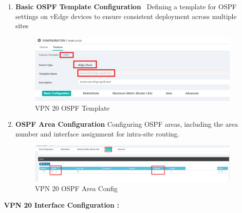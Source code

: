 \documentclass[12pt,english]{report}
\begin{document}
\begin{enumerate}
    \item \textbf{Basic OSPF Template Configuration} \
    Defining a template for OSPF settings on vEdge devices to ensure consistent deployment across multiple sites
\begin{figure}[H]
    \centering
    \includegraphics[width= 0.9 \textwidth]{chapitre 3/template/14.png}
    \caption{VPN 20 OSPF Template}
    \label{VPN 20 OSPF Template}
\end{figure}    
    \item \textbf{OSPF Area Configuration}
    Configuring OSPF areas, including the area number and interface assignment for intra-site routing.
\begin{figure}[H]
    \centering
    \includegraphics[width= 1 \textwidth]{chapitre 3/template/14.5.png}
    \caption{VPN 20 OSPF Area Config}
    \label{VPN 20 OSPF Area Config}
\end{figure}
\end{enumerate}
\textbf{VPN 20 Interface Configuration :}
\end{document}
